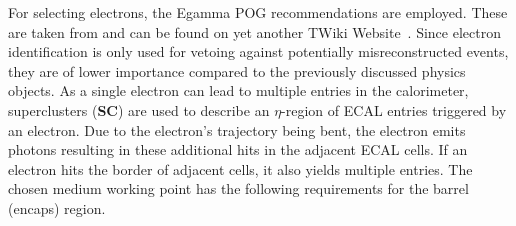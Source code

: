 For selecting electrons, the Egamma POG recommendations are employed. These are taken from and can be found on yet another TWiki Website~\cite{egammaid}. Since electron identification is only used for vetoing against potentially misreconstructed events, they are of lower importance compared to the previously discussed physics objects. As a single electron can lead to multiple entries in the calorimeter, superclusters (\textbf{SC}) are used to describe an $\eta$-region of ECAL entries triggered by an electron. Due to the electron's trajectory being bent, the electron emits photons resulting in these additional hits in the adjacent ECAL cells. If an electron hits the border of adjacent cells, it also yields multiple entries. The chosen medium working point has the following requirements for the barrel (encaps) region.

